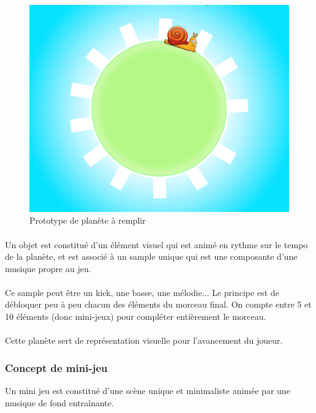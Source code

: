 \begin{figure}[H]\centering
  \includegraphics[scale=.4]{./img/protoPlanete.png}
  \caption{Prototype de planète à remplir}
  \label{protoPlanete}
\end{figure}

\paragraph{} Un objet est constitué d’un élément visuel qui est animé en rythme sur le tempo de la planète, et est associé à un sample unique qui est une composante d’une musique propre au jeu.\
\paragraph{}Ce sample peut être un kick, une basse, une mélodie... Le principe est de débloquer peu à peu chacun des éléments du morceau final. On compte entre 5 et 10 éléments (donc mini-jeux) pour compléter entièrement le morceau.
\paragraph{}Cette planète sert de représentation visuelle pour l’avancement du joueur.

\subsubsection{Concept de mini-jeu}
Un mini jeu est constitué d’une scène unique et minimaliste animée par une musique de fond entraînante.

